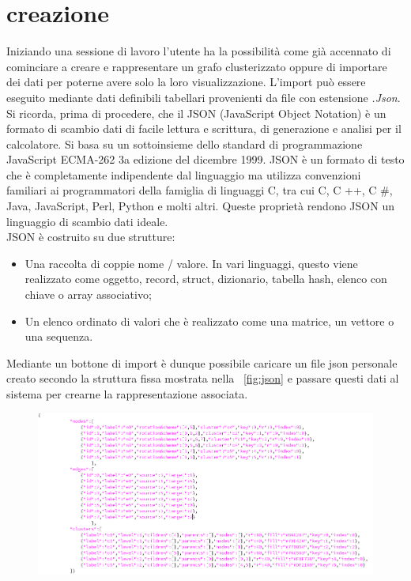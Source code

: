 {\section{creazione}
Iniziando una sessione di lavoro l'utente ha la possibilità come già accennato di cominciare a creare e rappresentare un grafo clusterizzato oppure di importare dei dati per poterne avere solo la loro visualizzazione. L'import può essere eseguito mediante dati definibili tabellari provenienti da file con estensione \textit{.Json}.\\
Si ricorda, prima di procedere, che il JSON (JavaScript Object Notation) è un formato di scambio dati di facile lettura e scrittura, di generazione e analisi per il calcolatore. Si basa su un sottoinsieme dello standard di programmazione JavaScript ECMA-262 3a edizione del dicembre 1999. JSON è un formato di testo che è completamente indipendente dal linguaggio ma utilizza convenzioni familiari ai programmatori della famiglia di linguaggi C, tra cui C, C ++, C \#, Java, JavaScript, Perl, Python e molti altri. Queste proprietà rendono JSON un linguaggio di scambio dati ideale.\\
JSON è costruito su due strutture:
\begin{itemize}
	\item Una raccolta di coppie nome / valore. In vari linguaggi, questo viene realizzato come oggetto, record, struct, dizionario, tabella hash, elenco con chiave o array associativo;
	\item Un elenco ordinato di valori che è realizzato come una matrice, un vettore o una sequenza. 
\end{itemize} 
Mediante un bottone di import è dunque possibile caricare un file json personale creato secondo la struttura fissa mostrata nella \figurename~\ref{fig:json} e passare questi dati al sistema per crearne la rappresentazione associata.\\
\begin{figure}[!htb]
	\begin{center}
		\includegraphics[width=1 \linewidth]{figure/json}

\end{center}
\end{figure}}
